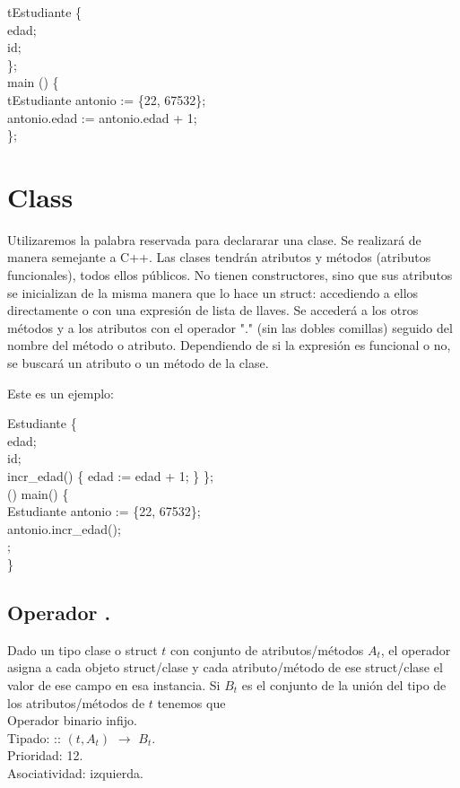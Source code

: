 \begin{algorithm}
	\Struct{} tEstudiante \{ \\
		\quad \Integer{} edad; \\
		\quad \Integer{} id; \\
	\}; \\

	\Void{} main () \{ \\
	\Struct{} tEstudiante antonio := \{22, 67532\}; \\
		\quad antonio.edad := antonio.edad + 1;  \\
	\};
\end{algorithm}

\section{Class}
Utilizaremos la palabra reservada \Class para declararar una clase. Se realizará de manera semejante a C++. Las clases tendrán atributos
y métodos (atributos funcionales), todos ellos públicos. No tienen constructores, sino que sus atributos se inicializan de la misma manera
que lo hace un struct: accediendo a ellos directamente o con una expresión de lista de llaves. Se accederá a los otros
métodos y a los atributos con el operador "." (sin las dobles comillas) seguido del nombre del método o atributo. 
Dependiendo de si la expresión es funcional o no, se buscará un atributo o un método de la clase.

Este es un ejemplo:

 
\begin{algorithm}
	\Class Estudiante \{ \\
		\quad \Integer{} edad; \\
		\quad \Integer{} id; \\
		\quad \Void incr\_edad() \{ edad := edad + 1; \}\;
	\}; \\

	\Void{}() main() \{ \\
		\quad Estudiante antonio := \{22, 67532\}; \\
		\quad antonio.incr\_edad(); 
		  \\
		\quad {} ; \\
	\} \;
\end{algorithm}

\subsection*{Operador .}
Dado un tipo clase o struct $t$ con conjunto de atributos/métodos $A_{t}$, el operador  asigna a cada objeto struct/clase y cada atributo/método de ese struct/clase el valor de ese campo en esa instancia. Si $B_{t}$ es el conjunto de la unión del tipo de los atributos/métodos de $t$ tenemos que
\\Operador  binario infijo.
\\Tipado:  :: 
$(t, A_{t})$
$\rightarrow$ $B_{t}$. 
\\Prioridad: 12.
\\Asociatividad: izquierda.

